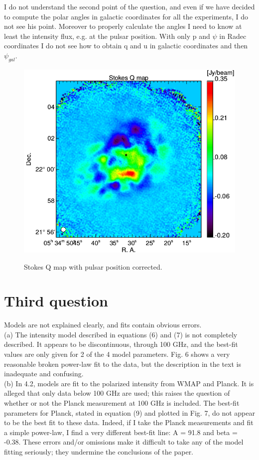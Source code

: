 \documentclass[report,twocolumn]{aa}
\begin{document}
{\color{blue}I do not understand the second point of the question, and even if we have decided to compute the polar angles in galactic coordinates for all the experiments, I do not see his point. Moreover to properly calculate the angles I need to know at least the intensity flux, e.g. at the pulsar position. With only p and $\psi$ in Radec coordinates I do not see how to obtain q and u in galactic coordinates and then $\psi_{gal}$.}

\begin{figure}[!h]
\centering
     	  { \includegraphics[width=1\linewidth,keepaspectratio]{referee_figures/crab_q_2mm_pulsPositionCor.png}}
\caption{Stokes Q map with pulsar position corrected.}     	  
 
\label{Q_map}
\end{figure}




\section{Third question}
Models are not explained clearly, and fits contain obvious errors.\\
(a) The intensity model described in equations (6) and (7) is not
completely described. It appears to be discontinuous, through 100
GHz, and the best-fit values are only given for 2 of the 4 model
parameters. Fig. 6 shows a very reasonable broken power-law fit to
the data, but the description in the text is inadequate and confusing.\\
(b) In 4.2, models are fit to the polarized intensity from WMAP and
Planck. It is alleged that only data below 100 GHz are used; this
raises the question of whether or not the Planck measurement at 100
GHz is included. The best-fit parameters for Planck, stated in
equation (9) and plotted in Fig. 7, do not appear to be the best fit
to these data. Indeed, if I take the Planck measurements and fit a
simple power-law, I find a very different best-fit line: A = 91.8 and
beta = -0.38.
These errors and/or omissions make it difficult to take any of the
model fitting seriously; they undermine the conclusions of the paper.
\\ \\
\end{document}
